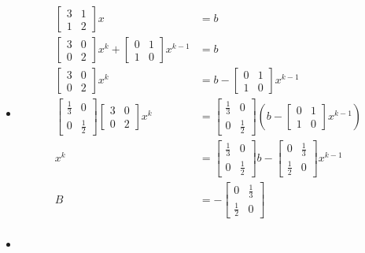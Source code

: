 \documentclass{article}
\begin{document}
\begin{enumerate}
\begin{enumerate}
\begin{itemize}
\item
\begin{align*}
\begin{bmatrix}
3&1\\1&2
\end{bmatrix} x &= b\\
\begin{bmatrix}
3&0\\0&2
\end{bmatrix} x^{k}+ \begin{bmatrix}
0&1\\1&0
\end{bmatrix} x^{k-1}&= b\\
\begin{bmatrix}
3&0\\0&2
\end{bmatrix} x^{k}&= b- \begin{bmatrix}
0&1\\1&0
\end{bmatrix} x^{k-1}\\
\begin{bmatrix}
\frac{1}{3}&0\\0&\frac{1}{2}
\end{bmatrix}\begin{bmatrix}
3&0\\0&2
\end{bmatrix} x^{k}&= \begin{bmatrix}
\frac{1}{3}&0\\0&\frac{1}{2}
\end{bmatrix}\left(b- \begin{bmatrix}
0&1\\1&0
\end{bmatrix} x^{k-1}\right)\\
 x^{k}&= \begin{bmatrix}
\frac{1}{3}&0\\0&\frac{1}{2}
\end{bmatrix}b- \begin{bmatrix}
0&\frac{1}{3}\\\frac{1}{2}&0
\end{bmatrix} x^{k-1}\\
B&=- \begin{bmatrix}
0&\frac{1}{3}\\\frac{1}{2}&0
\end{bmatrix}\\
\end{align*}
\item 
\begin{align*}

\end{align*}
\end{itemize}
\end{enumerate}
\end{enumerate}
\end{document}
